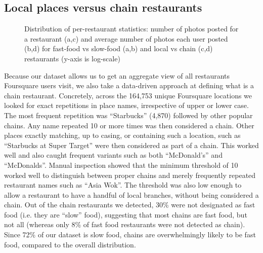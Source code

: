 \documentclass{sig-alternate-2013}
\begin{document}
\subsection{Local places versus chain restaurants}

\begin{figure}[h]
\vspace{0.2cm}
\begin{centering}
\hspace{0.05cm}
\hspace{0.05cm}
\hspace{0.05cm}
\caption{Distribution of per-restaurant statistics: number of photos posted for a restaurant (a,c) and average number of photos each user posted (b,d) for fast-food vs slow-food (a,b) and local vs chain (c,d) restaurants (y-axis is log-scale)}
\label{figure:localfast_pics}
\vspace{0cm}
\end{centering}\end{figure}

Because our dataset allows us to get an aggregate view of all restaurants Foursquare users visit, we also take a data-driven approach at defining what is a chain restaurant. Concretely, across the 164,753 unique Foursquare locations we looked for exact repetitions in place names, irrespective of upper or lower case. The most frequent repetition was ``Starbucks'' (4,870) followed by other popular chains. Any name repeated 10 or more times was then considered a chain. Other places exactly matching, up to casing, or containing such a location, such as ``Starbucks at Super Target'' were then considered as part of a chain. This worked well and also caught frequent variants such as both ``McDonald's'' and ``McDonalds''. Manual inspection showed that the minimum threshold of 10 worked well to distinguish between proper chains and merely frequently repeated restaurant names such as ``Asia Wok''. The threshold was also low enough to allow a restaurant to have a handful of local branches, without being considered a chain. Out of the chain restaurants we detected, 30\% were not designated as fast food (i.e. they are ``slow'' food), suggesting that most chains are fast food, but not all (whereas only 8\% of fast food restaurants were not detected as chain). Since 72\% of our dataset is slow food, chains are overwhelmingly likely to be fast food, compared to the overall distribution.
\end{document}
